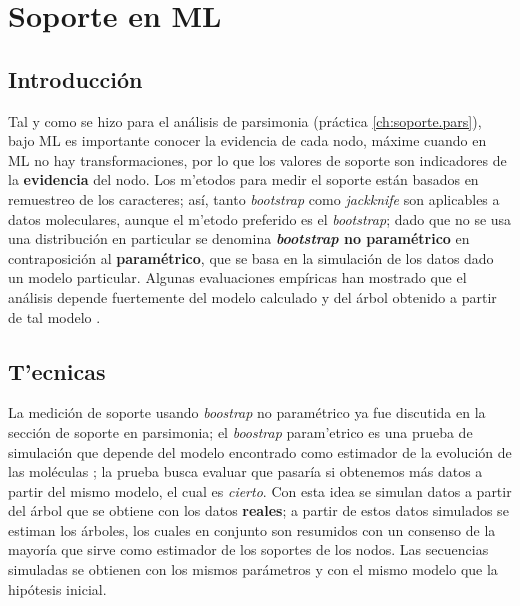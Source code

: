 \chapter{Soporte en ML}
\section*{Introducci\'on}


Tal y como se hizo para el an\'alisis de parsimonia (pr\'actica \ref{ch:soporte.pars}), bajo ML es importante conocer la evidencia de cada nodo, m\'axime cuando en ML no hay transformaciones, por lo que los valores de soporte son indicadores de la \textbf{evidencia} del nodo. Los m'etodos para medir el soporte est\'an basados en remuestreo de los caracteres; as\'i, tanto \textit{bootstrap} 
 como \textit{jackknife} 
 son aplicables a datos moleculares, aunque el m'etodo preferido es el \textit{bootstrap}; dado que no se usa una distribuci\'on en particular se denomina \textbf{\textit{bootstrap} no param\'etrico} en contraposici\'on al \textbf{param\'etrico}, que se basa en la simulaci\'on de los datos dado un modelo particular. Algunas evaluaciones emp\'iricas han mostrado que el an\'alisis depende fuertemente del modelo calculado y del \'arbol obtenido a partir de tal modelo \citep{Felsenstein2004,Antezana2003}.


\section*{T'ecnicas}
La medici\'on de soporte usando \textit{boostrap} no param\'etrico ya fue discutida en la secci\'on de soporte en parsimonia; el \textit{boostrap} param'etrico es una prueba de simulaci\'on que depende del modelo encontrado como estimador de la evoluci\'on de las mol\'eculas \citep{Felsenstein2004}; la prueba busca evaluar que pasar\'ia si obtenemos m\'as datos a partir del mismo modelo, el cual es \textit{cierto}. Con esta idea se simulan datos a partir del \'arbol que se obtiene con los datos \textbf{reales}; a partir de estos datos simulados se estiman los \'arboles, los cuales en conjunto son resumidos con un consenso de la mayor\'ia que sirve como estimador de los soportes de los nodos. Las secuencias simuladas se obtienen con los mismos par\'ametros y con el mismo modelo que la hip\'otesis inicial.




